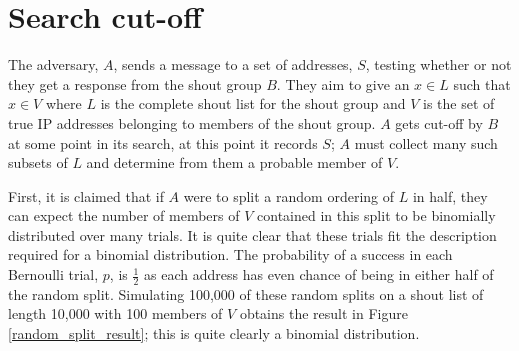\documentclass[ %
                    author={Luke Murray},
                supervisor={Dr. Simon Hollis},
                     title={Shadow Peer-to-Peer Networks},
                  subtitle={},
                    degree={MEng},
                      year={2013} ]{thesis}
\begin{document}

\section{Search cut-off}

The adversary, $A$, sends a message to a set of addresses, $S$, testing whether or not they get a response from the shout group $B$. They aim to give an $x \in L$ such that $x \in V$ where $L$ is the complete shout list for the shout group and $V$ is the set of true IP addresses belonging to members of the shout group. $A$ gets cut-off by $B$ at some point in its search, at this point it records $S$; $A$ must collect many such subsets of $L$ and determine from them a probable member of $V$.

First, it is claimed that if $A$ were to split a random ordering of $L$ in half, they can expect the number of members of $V$ contained in this split to be binomially distributed over many trials. It is quite clear that these trials fit the description required for a binomial distribution. The probability of a success in each Bernoulli trial, $p$, is $\frac{1}{2}$ as each address has even chance of being in either half of the random split. Simulating 100,000 of these random splits on a shout list of length 10,000 with 100 members of $V$ obtains the result in Figure \ref{random_split_result}; this is quite clearly a binomial distribution. 
\end{document}
